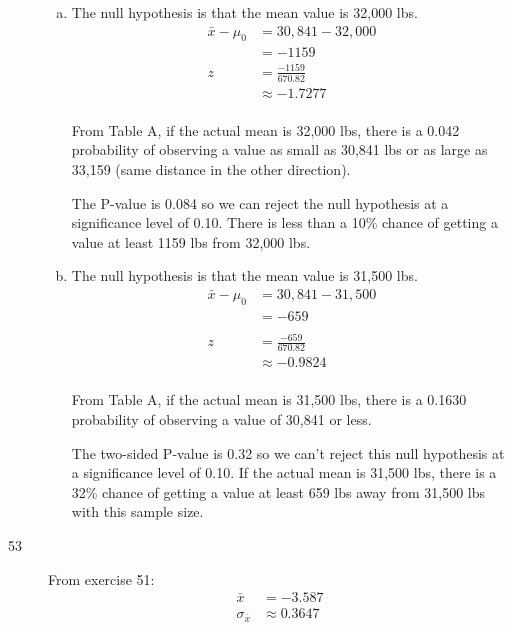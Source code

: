 \documentclass[letterpaper]{exam}
\begin{document}
\begin{description}
\begin{enumerate}[(a)]
          \item 
            The null hypothesis is that the mean value is 32,000 lbs.
            \begin{align*}
              \bar{x} - \mu_0 & = 30,841 - 32,000 \\
                              & = -1159 \\
              z & = \frac{-1159}{670.82} \\
                & \approx -1.7277 \\
            \end{align*}

            From Table A, if the actual mean is 32,000 lbs, there is a 0.042
            probability of observing a value as small as 30,841 lbs or as large
            as 33,159 (same distance in the other direction).

            The P-value is 0.084 so we can reject the null hypothesis at a
            significance level of 0.10. There is less than a 10\% chance of
            getting a value at least 1159 lbs from 32,000 lbs.

          \item 
            The null hypothesis is that the mean value is 31,500 lbs.
            \begin{align*}
              \bar{x} - \mu_0 & = 30,841 - 31,500 \\
                              & = -659 \\
              \\
              z  & = \frac{-659}{670.82} \\
                 & \approx -0.9824 \\
            \end{align*}

            From Table A, if the actual mean is 31,500 lbs, there is a 0.1630
            probability of observing a value of 30,841 or less.

            The two-sided P-value is 0.32 so we can't reject this null hypothesis
            at a significance level of 0.10. If the actual mean is 31,500 lbs,
            there is a 32\% chance of getting a value at least 659 lbs away from
            31,500 lbs with this sample size.

        \end{enumerate}

      \item[53]
        From exercise 51:
        \begin{align*}
            \bar{x}          & = -3.587 \\
            \sigma_{\bar{x}} & \approx 0.3647 \\
        \end{align*}


\end{description}
\end{document}
